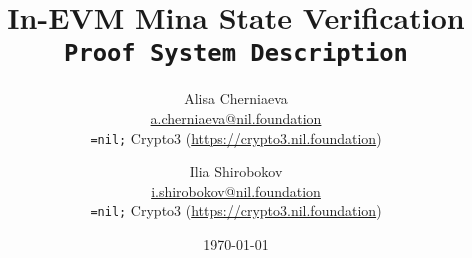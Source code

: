 \setlength{\droptitle}{-4\baselineskip} %

\pretitle{\begin{center}\Huge\bfseries} %
\title{In-EVM Mina State Verification \\ \texttt{Proof System Description}} %
\posttitle{\end{center}} %
\author{ %
	\protect\begin{tabular}{c} \normalsize Alisa Cherniaeva\\
	    \normalsize \href{mailto:a.cherniaeva@nil.foundation}{a.cherniaeva@nil.foundation} \\
	    \normalsize \texttt{=nil;} Crypto3 (\url{https://crypto3.nil.foundation})\\ 
	\protect\end{tabular}
	\and
	\protect\begin{tabular}{c} \normalsize Ilia Shirobokov\\
	    \normalsize \href{mailto:i.shirobokov@nil.foundation}{i.shirobokov@nil.foundation} \\
	    \normalsize \texttt{=nil;} Crypto3 (\url{https://crypto3.nil.foundation})\\ 
	\protect\end{tabular}
}
\date{\today} %
